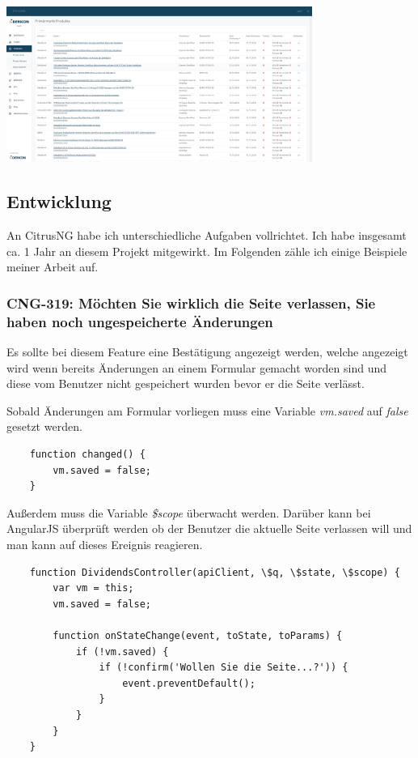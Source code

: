 \documentclass[chapterprefix=false, 12pt, a4paper, oneside, parskip=half, listof=totoc, bibliography=totoc, numbers=noendperiod]{scrbook}
\begin{document}
    \begin{center}
        \includegraphics[width=0.75\textwidth]{img/citrusng.png}
    \end{center}

    \subsection{Entwicklung}

    An CitrusNG habe ich unterschiedliche Aufgaben vollrichtet. Ich habe insgesamt ca. 1 Jahr an diesem Projekt mitgewirkt.
    Im Folgenden zähle ich einige Beispiele meiner Arbeit auf.

    \subsubsection{CNG-319: Möchten Sie wirklich die Seite verlassen, Sie haben noch ungespeicherte Änderungen}

    Es sollte bei diesem Feature eine Bestätigung angezeigt werden, welche angezeigt wird wenn bereits Änderungen an einem Formular
    gemacht worden sind und diese vom Benutzer nicht gespeichert wurden bevor er die Seite verlässt.

    Sobald Änderungen am Formular vorliegen muss eine Variable \textit{vm.saved} auf \textit{false} gesetzt werden.

    \begin{verbatim}
    function changed() {
        vm.saved = false;
    }
    \end{verbatim}

    Außerdem muss die Variable \textit{\$scope} überwacht werden. Darüber kann bei AngularJS überprüft werden ob der
    Benutzer die aktuelle Seite verlassen will und man kann auf dieses Ereignis reagieren.

    \begin{verbatim}
    function DividendsController(apiClient, \$q, \$state, \$scope) {
        var vm = this;
        vm.saved = false;

        function onStateChange(event, toState, toParams) {
            if (!vm.saved) {
                if (!confirm('Wollen Sie die Seite...?')) {
                    event.preventDefault();
                }
            }
        }
    }
    \end{verbatim}
\end{document}
